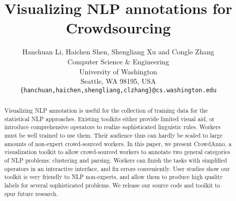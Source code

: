 \documentclass[11pt]{article}
\title{Visualizing NLP annotations for Crowdsourcing }
\author{Hanchuan Li, Haichen Shen, Shengliang Xu and Congle Zhang\\
 Computer Science \& Engineering \\
 University of Washington\\
 Seattle, WA 98195, USA \\
 {\tt \{hanchuan,haichen,shengliang,clzhang\}@cs.washington.edu} \\}
\newcommand{\sys}{\mbox{\sc CrowdAnno}}   %
\begin{document}
\maketitle

\begin{abstract}
Visualizing NLP annotation is useful for the collection of training data for the statistical NLP approaches.  Existing toolkits either provide limited visual aid, or introduce comprehensive operators to realize sophisticated linguistic rules. Workers must be well trained to use them. Their audience thus can hardly be scaled to large amounts of non-expert crowd-sourced workers. In this paper, we present \sys, a visualization toolkit to allow crowd-sourced workers to annotate two general categories of NLP problems: clustering and parsing. Workers can finish the tasks with simplified operators in an interactive interface, and fix errors conveniently. User studies show our toolkit is very friendly to NLP non-experts, and allow them to produce high quality labels for several sophisticated problems. We release our source code and toolkit to spur future research.
\end{abstract}












%


\end{document}
